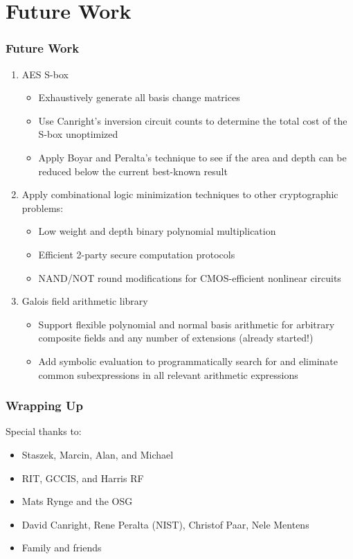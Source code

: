 \documentclass[handout,10pt]{beamer}
\begin{document}
\section{Future Work}
\begin{frame}
	\frametitle{Future Work}
	\begin{enumerate}
		\item AES S-box
		\begin{itemize}
			\item Exhaustively generate all basis change matrices
			\item Use Canright's inversion circuit counts to determine the total cost of the S-box unoptimized
			\item Apply Boyar and Peralta's technique to see if the area and depth can be reduced below the current best-known result
		\end{itemize}
		\pause
		\item Apply combinational logic minimization techniques to other cryptographic problems:
		\begin{itemize}
			\item Low weight and depth binary polynomial multiplication
			\item Efficient 2-party secure computation protocols
			\item NAND/NOT round modifications for CMOS-efficient nonlinear circuits
		\end{itemize}
		\pause
		\item Galois field arithmetic library
		\begin{itemize}
			\item Support flexible polynomial and normal basis arithmetic for arbitrary composite fields and any number of extensions (already started!)
			\item Add symbolic evaluation to programmatically search for and eliminate common subexpressions in all relevant arithmetic expressions
		\end{itemize}
	\end{enumerate}
\end{frame}

\begin{frame}
	\frametitle{Wrapping Up}
	Special thanks to:
	\begin{itemize}
		\item Staszek, Marcin, Alan, and Michael
		\item RIT, GCCIS, and Harris RF
		\item Mats Rynge and the OSG
		\item David Canright, Rene Peralta (NIST), Christof Paar, Nele Mentens
		\item Family and friends
	\end{itemize}
\end{frame}
\end{document}
